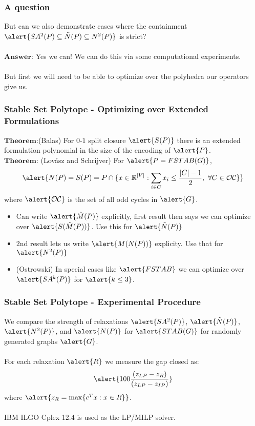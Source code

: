 \documentclass{beamer}
\begin{document}
\begin{frame}
\frametitle{A question}
But can we also demonstrate cases where the containment $\alert{SA^2(P) \subseteq \tilde{N}(P) \subseteq N^2(P)}$ is strict?\\\ \\
$\textbf{Answer:}$ Yes we can! We can do this via some computational experiments.\\\ \\
But first we will need to be able to optimize over the polyhedra our operators give us.
\end{frame}

\begin{frame}
\frametitle{Stable Set Polytope - Optimizing over Extended Formulations}
$\textbf{Theorem:}$(Balas) For $0$-$1$ split closure $\alert{S(P)}$ there is an extended formulation polynomial in the size of the encoding of $\alert{P}$.\\
$\textbf{Theorem:}$ (Lov\'asz and Schrijver) For $\alert{P = FSTAB(G)}$, $$\alert{N(P) = S(P) = P \cap \{x \in \R^{|V|} : \sum_{i \in C} x_i \leq \frac{|C|-1}{2},\ \forall C \in \mathcal{O}\mathcal{C}\}}$$
where $\alert{\mathcal{O}\mathcal{C}}$ is the set of all odd cycles in $\alert{G}$.
\begin{itemize}
\item Can write $\alert{\hat{M}(P)}$ explicitly, first result then says we can optimize over $\alert{S(\hat{M}(P))}$. Use this for $\alert{\tilde{N}(P)}$
\item $2$nd result lets us write $\alert{M(N(P))}$ explicity. Use that for $\alert{N^2(P)}$
\item (Ostrowski) In special cases like $\alert{FSTAB}$ we can optimize over $\alert{SA^k(P)}$ for $\alert{k\leq 3}$.
\end{itemize}
\end{frame}

\begin{frame}
\frametitle{Stable Set Polytope - Experimental Procedure}
We compare the strength of relaxations $\alert{SA^2(P)}$, $\alert{\tilde{N}(P)}$, $\alert{N^2(P)}$, and $\alert{N(P)}$ for $\alert{STAB(G)}$ for randomly generated graphs $\alert{G}$.\\\ \\
For each relaxation $\alert{R}$ we measure the gap closed as:
$$ \alert{100 \frac{(z_{LP} - z_{R})}{(z_{LP} - z_{IP})}}$$
where $\alert{z_R = \max\{c^Tx:x \in R\}}$.\\\ \\
IBM ILGO Cplex 12.4 is used as the LP/MILP solver.
\end{frame}
\end{document}
